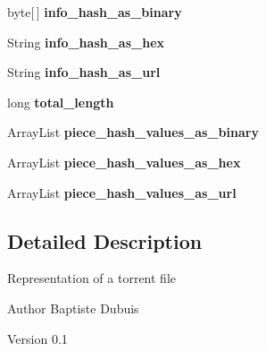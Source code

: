 \begin{DoxyCompactItemize}
\item 
\hypertarget{classj_bittorrent_a_p_i_1_1_torrent_file_ab4cf69f9d2179cfc4c7964575c133b91}{
byte\mbox{[}$\,$\mbox{]} {\bfseries info\_\-hash\_\-as\_\-binary}}
\label{classj_bittorrent_a_p_i_1_1_torrent_file_ab4cf69f9d2179cfc4c7964575c133b91}

\item 
\hypertarget{classj_bittorrent_a_p_i_1_1_torrent_file_a97a9a2a8f8d394d70a0f30ae480af0f3}{
String {\bfseries info\_\-hash\_\-as\_\-hex}}
\label{classj_bittorrent_a_p_i_1_1_torrent_file_a97a9a2a8f8d394d70a0f30ae480af0f3}

\item 
\hypertarget{classj_bittorrent_a_p_i_1_1_torrent_file_a2ac42cba6627a45aa3b6e3ae0732e810}{
String {\bfseries info\_\-hash\_\-as\_\-url}}
\label{classj_bittorrent_a_p_i_1_1_torrent_file_a2ac42cba6627a45aa3b6e3ae0732e810}

\item 
\hypertarget{classj_bittorrent_a_p_i_1_1_torrent_file_a978983152cdc3b6e529c2d219a8ea88f}{
long {\bfseries total\_\-length}}
\label{classj_bittorrent_a_p_i_1_1_torrent_file_a978983152cdc3b6e529c2d219a8ea88f}

\item 
\hypertarget{classj_bittorrent_a_p_i_1_1_torrent_file_aea47433ee2137ff3698f1d56e861d501}{
ArrayList {\bfseries piece\_\-hash\_\-values\_\-as\_\-binary}}
\label{classj_bittorrent_a_p_i_1_1_torrent_file_aea47433ee2137ff3698f1d56e861d501}

\item 
\hypertarget{classj_bittorrent_a_p_i_1_1_torrent_file_adedd7ce7fbd70d6314da38d34b55c8c6}{
ArrayList {\bfseries piece\_\-hash\_\-values\_\-as\_\-hex}}
\label{classj_bittorrent_a_p_i_1_1_torrent_file_adedd7ce7fbd70d6314da38d34b55c8c6}

\item 
\hypertarget{classj_bittorrent_a_p_i_1_1_torrent_file_a415d8178349555e78a9fdce2ff31acf2}{
ArrayList {\bfseries piece\_\-hash\_\-values\_\-as\_\-url}}
\label{classj_bittorrent_a_p_i_1_1_torrent_file_a415d8178349555e78a9fdce2ff31acf2}

\end{DoxyCompactItemize}


\subsection{Detailed Description}
Representation of a torrent file

\begin{DoxyAuthor}{Author}
Baptiste Dubuis 
\end{DoxyAuthor}
\begin{DoxyVersion}{Version}
0.1 
\end{DoxyVersion}


